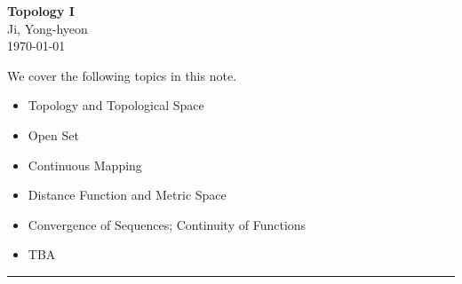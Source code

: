 \documentclass[11pt,openany]{article}
\begin{document}
\begin{center}
	\huge\textbf{Topology I}\\
	\vspace{0.5em}
	\large{Ji, Yong-hyeon}\\
	\vspace{0.5em}
	\normalsize{\today}\\
\end{center}

\noindent 
We cover the following topics in this note.
\begin{itemize}
	\item Topology and Topological Space
	\item Open Set
	\item Continuous Mapping
	\item Distance Function and Metric Space
	\item Convergence of Sequences; Continuity of Functions
	\item TBA
\end{itemize}
\hrule\vspace{12pt}
\end{document}
